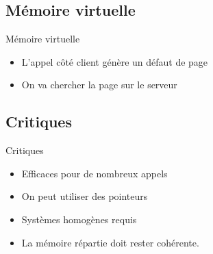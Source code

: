 \begin{frame}{\sectitle}
    \def\subsectitle{Mémoire virtuelle}
    \subsection{\subsectitle}
    \begin{block}{\subsectitle}
        \begin{itemize}
            \item L'appel côté client génère un défaut de page
            \item On va chercher la page sur le serveur
        \end{itemize}
    \end{block}
    \def\subsectitle{Critiques}
    \subsection{\subsectitle}
    \begin{block}{\subsectitle}
        \begin{itemize}
            \item Efficaces pour de nombreux appels
            \item On peut utiliser des pointeurs
            \item Systèmes homogènes requis
            \item La mémoire répartie doit rester cohérente.
        \end{itemize}
    \end{block}
\end{frame}

